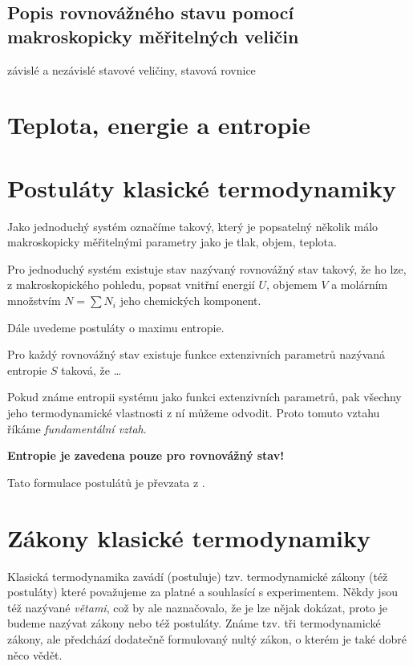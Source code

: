 \subsection{Popis rovnovážného stavu pomocí makroskopicky měřitelných veličin}

závislé a nezávislé stavové veličiny, stavová rovnice

\section{Teplota, energie a entropie}

\section{Postuláty klasické termodynamiky}

Jako jednoduchý systém označíme takový, který je popsatelný několik málo makroskopicky měřitelnými parametry jako je tlak, objem, teplota.  

\begin{theorem}
Pro jednoduchý systém existuje stav nazývaný rovnovážný stav takový, že ho lze, z makroskopického pohledu, popsat vnitřní energií $U$, objemem $V$ a molárním množstvím $N = \sum N_i$ jeho chemických komponent.  
\end{theorem}

Dále uvedeme postuláty o maximu entropie.

\begin{theorem}
Pro každý rovnovážný stav existuje funkce extenzivních parametrů nazývaná entropie $S$ taková, že \ldots 
\end{theorem}

Pokud známe entropii systému jako funkci extenzivních parametrů, pak všechny jeho termodynamické vlastnosti z ní můžeme odvodit. Proto tomuto vztahu říkáme \textit{fundamentální vztah}.

\textbf{Entropie je zavedena pouze pro rovnovážný stav!}

Tato formulace postulátů je převzata z \cite{Callen1985}.

\section{Zákony klasické termodynamiky}

Klasická termodynamika zavádí (postuluje) tzv. termodynamické zákony (též postuláty) které považujeme za platné a souhlasící s experimentem. Někdy jsou též nazývané \textit{větami}, což by ale naznačovalo, že je lze nějak dokázat, proto je budeme nazývat zákony nebo též postuláty. Známe tzv. tři termodynamické zákony, ale předchází dodatečně formulovaný nultý zákon, o kterém je také dobré něco vědět. 

